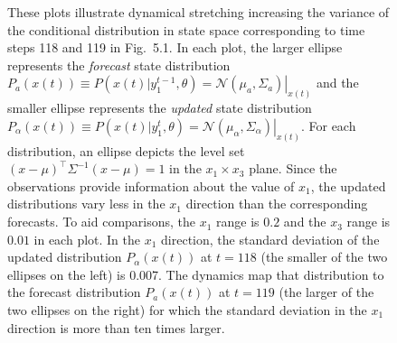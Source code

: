 \documentclass[prelim,showlabels]{book}
\newcommand{\NormalE}[3]{{\mathcal{N}}\left.\left(#1,#2\right)\right|_{#3}}
\newcommand{\transpose}{^\top}
\newcommand{\ti}[2]{{#1}{(#2)}}                  %
\newcommand{\ts}[3]{#1_{#2}^{#3}}                    %
\begin{document}
\begin{figure}[htbp]
  \centering{
  }
  \caption[Dynamical stretching increases state variance.]%
  {These plots illustrate dynamical stretching increasing the variance
    of the conditional distribution in state space corresponding to
    time steps 118 and 119 in Fig.~5.1.  In each plot,
    the larger ellipse represents the \emph{forecast} state
    distribution $P_{a} \left(\ti{x}{t} \right) \equiv P
    \left(\ti{x}{t}|\ts{y}{1}{t-1},\theta \right) =
    \NormalE{\mu_a}{\Sigma_a}{\ti{x}{t}}$ and the smaller ellipse
    represents the \emph{updated} state distribution $P_{\alpha}
    \left(\ti{x}{t} \right) \equiv P \left(\ti{x}{t}|\ts{y}{1}{t},
      \theta \right) =
    \NormalE{\mu_\alpha}{\Sigma_\alpha}{\ti{x}{t}}$.  For each
    distribution, an ellipse depicts the level set $(x-\mu)\transpose
    \Sigma^{-1} (x-\mu) =1$ in the $x_1\times x_3$ plane.  Since the
    observations provide information about the value of $x_1$, the
    updated distributions vary less in the $x_1$ direction than the
    corresponding forecasts.  To aid comparisons, the $x_1$ range is
    $0.2$ and the $x_3$ range is $0.01$ in each plot.  In the $x_1$
    direction, the standard deviation of the updated distribution
    $P_{\alpha}(\ti{x}{t})$ at $t=118$ (the smaller of the two
    ellipses on the left) is 0.007.  The dynamics map that
    distribution to the forecast distribution $P_{a}(\ti{x}{t})$ at
    $t=119$ (the larger of the two ellipses on the right) for which
    the standard deviation in the $x_1$ direction is more than ten
    times larger.}
  \label{fig:ToyStretch}
\end{figure}
\end{document}
